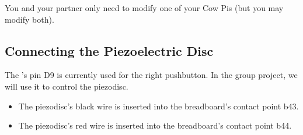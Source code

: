 You and your partner only need to modify one of your Cow Pis (but you may modify both).

\subsection{Connecting the Piezoelectric Disc}

The \developmentboard's pin D9 is currently used for the right pushbutton.
In the group project, we will use it to control the piezodisc.

\begin{description}
        \begin{itemize}
            \item The piezodisc's black wire is inserted into the breadboard's contact point b43.
            \item The piezodisc's red wire is inserted into the breadboard's contact point b44.
        \end{itemize}
\end{description}

